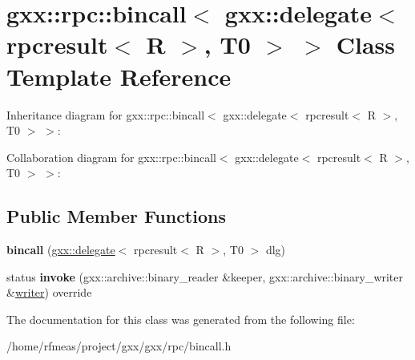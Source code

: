 \hypertarget{classgxx_1_1rpc_1_1bincall_3_01gxx_1_1delegate_3_01rpcresult_3_01R_01_4_00_01T0_01_4_01_4}{}\section{gxx\+:\+:rpc\+:\+:bincall$<$ gxx\+:\+:delegate$<$ rpcresult$<$ R $>$, T0 $>$ $>$ Class Template Reference}
\label{classgxx_1_1rpc_1_1bincall_3_01gxx_1_1delegate_3_01rpcresult_3_01R_01_4_00_01T0_01_4_01_4}


Inheritance diagram for gxx\+:\+:rpc\+:\+:bincall$<$ gxx\+:\+:delegate$<$ rpcresult$<$ R $>$, T0 $>$ $>$\+:


Collaboration diagram for gxx\+:\+:rpc\+:\+:bincall$<$ gxx\+:\+:delegate$<$ rpcresult$<$ R $>$, T0 $>$ $>$\+:
\subsection*{Public Member Functions}
\begin{DoxyCompactItemize}
\item 
{\bfseries bincall} (\hyperlink{classgxx_1_1delegate}{gxx\+::delegate}$<$ rpcresult$<$ R $>$, T0 $>$ dlg)\hypertarget{classgxx_1_1rpc_1_1bincall_3_01gxx_1_1delegate_3_01rpcresult_3_01R_01_4_00_01T0_01_4_01_4_a4d2c5c3569c5b0a4de9ce745a16092ba}{}\label{classgxx_1_1rpc_1_1bincall_3_01gxx_1_1delegate_3_01rpcresult_3_01R_01_4_00_01T0_01_4_01_4_a4d2c5c3569c5b0a4de9ce745a16092ba}

\item 
status {\bfseries invoke} (gxx\+::archive\+::binary\+\_\+reader \&keeper, gxx\+::archive\+::binary\+\_\+writer \&\hyperlink{classgxx_1_1writer}{writer}) override\hypertarget{classgxx_1_1rpc_1_1bincall_3_01gxx_1_1delegate_3_01rpcresult_3_01R_01_4_00_01T0_01_4_01_4_ac91d5c6d7486bdc78c85755429d00f7c}{}\label{classgxx_1_1rpc_1_1bincall_3_01gxx_1_1delegate_3_01rpcresult_3_01R_01_4_00_01T0_01_4_01_4_ac91d5c6d7486bdc78c85755429d00f7c}

\end{DoxyCompactItemize}


The documentation for this class was generated from the following file\+:\begin{DoxyCompactItemize}
\item 
/home/rfmeas/project/gxx/gxx/rpc/bincall.\+h\end{DoxyCompactItemize}
